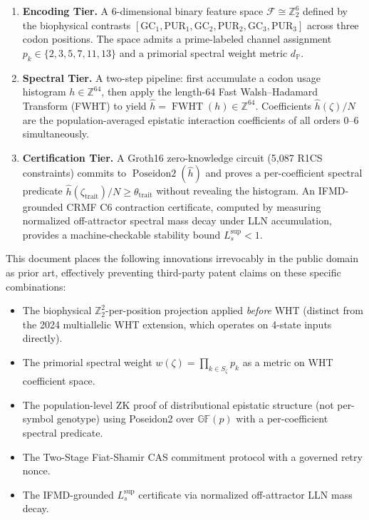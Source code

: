 \documentclass[12pt,letterpaper]{article}
\theoremstyle{definition}
\theoremstyle{plain}
\theoremstyle{remark}
\newcommand{\FWHT}{\operatorname{FWHT}}
\newcommand{\Poseidon}{\operatorname{Poseidon2}}
\newcommand{\dP}{d_{\mathbb{P}}}
\newcommand{\hhat}{\hat{h}}
\newcommand{\Lsup}{L_s^{\sup}}
\newcommand{\GFp}{\mathbb{GF}(p)}
\begin{document}
\begin{enumerate}[leftmargin=*]
  \item \textbf{Encoding Tier.} A 6-dimensional binary feature space $\mathcal{F} \cong \mathbb{Z}_2^6$ defined by the biophysical contrasts $[\mathrm{GC}_1, \mathrm{PUR}_1, \mathrm{GC}_2, \mathrm{PUR}_2, \mathrm{GC}_3, \mathrm{PUR}_3]$ across three codon positions. The space admits a prime-labeled channel assignment $p_k \in \{2,3,5,7,11,13\}$ and a primorial spectral weight metric $\dP$.

  \item \textbf{Spectral Tier.} A two-step pipeline: first accumulate a codon usage histogram $h \in \mathbb{Z}^{64}$, then apply the length-64 Fast Walsh--Hadamard Transform (FWHT) to yield $\hhat = \FWHT(h) \in \mathbb{Z}^{64}$. Coefficients $\hhat(\zeta)/N$ are the population-averaged epistatic interaction coefficients of all orders 0--6 simultaneously.

  \item \textbf{Certification Tier.} A Groth16 zero-knowledge circuit (5{,}087 R1CS constraints) commits to $\Poseidon(\hhat)$ and proves a per-coefficient spectral predicate $\hhat(\zeta_{\mathrm{trait}})/N \ge \theta_{\mathrm{trait}}$ without revealing the histogram. An IFMD-grounded CRMF C6 contraction certificate, computed by measuring normalized off-attractor spectral mass decay under LLN accumulation, provides a machine-checkable stability bound $\Lsup < 1$.
\end{enumerate}

\begin{claimbox}
This document places the following innovations irrevocably in the public domain as prior art, effectively preventing third-party patent claims on these specific combinations:
\begin{itemize}
  \item The biophysical $\mathbb{Z}_2^2$-per-position projection applied \emph{before} WHT (distinct from the 2024 multiallelic WHT extension, which operates on 4-state inputs directly).
  \item The primorial spectral weight $w(\zeta) = \prod_{k \in S_\zeta} p_k$ as a metric on WHT coefficient space.
  \item The population-level ZK proof of distributional epistatic structure (not per-symbol genotype) using Poseidon2 over $\GFp$ with a per-coefficient spectral predicate.
  \item The Two-Stage Fiat-Shamir CAS commitment protocol with a governed retry nonce.
  \item The IFMD-grounded $\Lsup$ certificate via normalized off-attractor LLN mass decay.
\end{itemize}
\end{claimbox}
\end{document}
